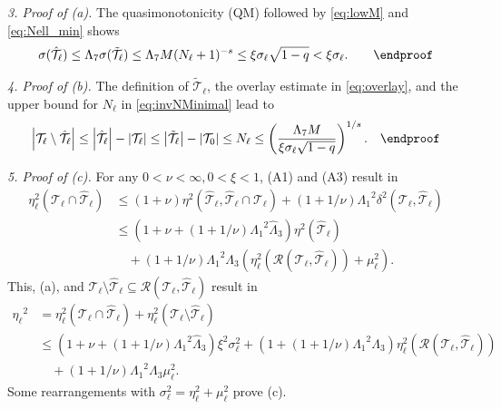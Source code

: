 \documentclass{siamltex1213}
\begin{document}
	\textit{3. Proof of (a).} The quasimonotonicity (QM) followed by \eqref{eq:lowM} and \eqref{eq:Nell_min} shows
	\begin{align*}
		\sigma({\hat{\mathcal{T}}_{\ell}}) \leq {\ensuremath{\Lambda_{\mathrm{7}}}}  \sigma({\tilde{\mathcal{T}}_{\ell}}) \leq {{\ensuremath{\Lambda_{\mathrm{7}}}} M} 
		(N_\ell+1)^{-s} \leq \xi \sigma_\ell\sqrt{1-q}<\xi \sigma_\ell.\qquad \endproof
	\end{align*}

	\textit{4. Proof of (b).}
	The definition of ${\tilde{\mathcal{T}}_{\ell}}$, the overlay estimate in \eqref{eq:overlay}, and the upper bound for $N_\ell$ in \eqref{eq:invNMinimal} lead to
	\begin{align*}
		{\left\lvert {{\mathcal T_{\ell}}\setminus {\hat{\mathcal{T}}_{\ell}}} \right\rvert}\leq {\left\lvert {{\hat{\mathcal{T}}_{\ell}}} \right\rvert}-{\left\lvert {{\mathcal T_{\ell}}} \right\rvert} \leq
		{\left\lvert {{\tilde{\mathcal{T}}_{\ell}}} \right\rvert}-{\left\lvert {{\mathcal T_{0}}} \right\rvert}\leq N_\ell \leq \left( \frac{{\ensuremath{\Lambda_{\mathrm{7}}}} M}{\xi \sigma_\ell\sqrt{1-q}} \right)^{1/s}.\quad \endproof
	\end{align*}
	
	\textit{5. Proof of (c).}
	For any $0<\nu< \infty, 0<\xi<1$,  (A1) and (A3) result in 
	\begin{align*}
		\eta^2_\ell({\mathcal T_{\ell}}\cap {\hat{\mathcal{T}}_{\ell}}) &\leq (1+\nu)\eta^2({\hat{\mathcal{T}}_{\ell}},{\hat{\mathcal{T}}_{\ell}} \cap {\mathcal T_{\ell}}) + (1+1/\nu){\ensuremath{\Lambda_{\mathrm{1}}}}^2 \delta^2({\mathcal T_{\ell}},{\hat{\mathcal{T}}_{\ell}})\\
		& \leq\left(1+\nu+ (1+1/\nu){\ensuremath{\Lambda_{\mathrm{1}}}}^2{\ensuremath{\widehat{\Lambda}_{\mathrm{3}}}}\right)\eta^2({\hat{\mathcal{T}}_{\ell}}) \\
		& \quad + (1+1/\nu){\ensuremath{\Lambda_{\mathrm{1}}}}^2{\ensuremath{\Lambda_{\mathrm{3}}}} \left( \eta^2_\ell(\mathcal R({\mathcal T_{\ell}}, {\hat{\mathcal{T}}_{\ell}})) + \mu^2_\ell\right).
	\end{align*}
	This, (a),  and ${\mathcal T_{\ell}} \setminus {\hat{\mathcal{T}}_{\ell}} \subseteq \mathcal R({\mathcal T_{\ell}}, {\hat{\mathcal{T}}_{\ell}})$ result in
	\begin{align*}
		{\eta_{{\ell}}}^2 &= \eta^2_\ell({\mathcal T_{\ell}}\cap {\hat{\mathcal{T}}_{\ell}}) + \eta^2_\ell({\mathcal T_{\ell}} \setminus {\hat{\mathcal{T}}_{\ell}}) \\
		&\leq \left(1+\nu+ (1+1/\nu){\ensuremath{\Lambda_{\mathrm{1}}}}^2{\ensuremath{\widehat{\Lambda}_{\mathrm{3}}}}\right)\xi^2 \sigma^2_\ell + \left(1+( 1+1/\nu){\ensuremath{\Lambda_{\mathrm{1}}}}^2{\ensuremath{\Lambda_{\mathrm{3}}}}\right) \eta^2_\ell(\mathcal R({\mathcal T_{\ell}}, {\hat{\mathcal{T}}_{\ell}})) \\
		&\quad +   ( 1+1/\nu){\ensuremath{\Lambda_{\mathrm{1}}}}^2{\ensuremath{\Lambda_{\mathrm{3}}}}\mu^2_\ell. 
		\end{align*}
		Some rearrangements with $\sigma^2_\ell=\eta^2_\ell+\mu_\ell^2$ prove (c).
\qquad \endproof
\end{document}
